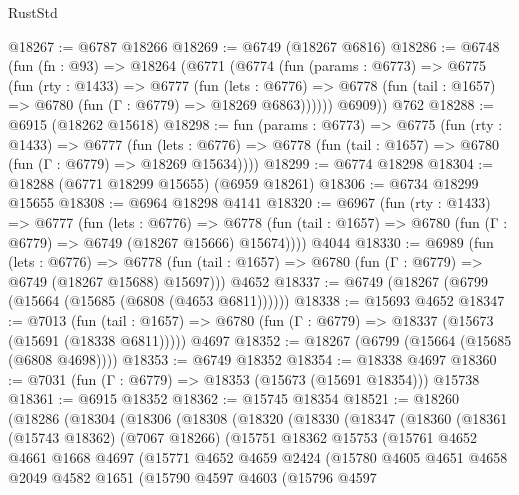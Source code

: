 \begin{lexlean}{RustStd}
\begin{coremodule}
@18267 := @6787 @18266
@18269 := @6749 (@18267 @6816)
@18286 := @6748
    (fun (fn : @93) =>
    @18264
      (@6771
        (@6774
          (fun (params : @6773) =>
          @6775
            (fun (rty : @1433) =>
            @6777
              (fun (lets : @6776) =>
              @6778 (fun (tail : @1657) => @6780 (fun (Γ : @6779) => @18269 @6863))))))
        @6909))
    @762
@18288 := @6915 (@18262 @15618)
@18298 := fun (params : @6773) =>
  @6775
    (fun (rty : @1433) =>
    @6777
      (fun (lets : @6776) =>
      @6778 (fun (tail : @1657) => @6780 (fun (Γ : @6779) => @18269 @15634))))
@18299 := @6774 @18298
@18304 := @18288 (@6771 @18299 @15655) (@6959 @18261)
@18306 := @6734 @18299 @15655
@18308 := @6964 @18298 @4141
@18320 := @6967
    (fun (rty : @1433) =>
    @6777
      (fun (lets : @6776) =>
      @6778 (fun (tail : @1657) => @6780 (fun (Γ : @6779) => @6749 (@18267 @15666) @15674))))
    @4044
@18330 := @6989
    (fun (lets : @6776) =>
    @6778 (fun (tail : @1657) => @6780 (fun (Γ : @6779) => @6749 (@18267 @15688) @15697)))
    @4652
@18337 := @6749 (@18267 (@6799 (@15664 (@15685 (@6808 (@4653 @6811))))))
@18338 := @15693 @4652
@18347 := @7013
    (fun (tail : @1657) => @6780 (fun (Γ : @6779) => @18337 (@15673 (@15691 (@18338 @6811)))))
    @4697
@18352 := @18267 (@6799 (@15664 (@15685 (@6808 @4698))))
@18353 := @6749 @18352
@18354 := @18338 @4697
@18360 := @7031 (fun (Γ : @6779) => @18353 (@15673 (@15691 @18354))) @15738
@18361 := @6915 @18352
@18362 := @15745 @18354
@18521 := @18260
    (@18286
      (@18304
        (@18306
          (@18308
            (@18320
              (@18330
                (@18347
                  (@18360
                    (@18361
                      (@15743 @18362)
                      (@7067 @18266)
                      (@15751
                        @18362
                        @15753
                        (@15761
                          @4652
                          @4661
                          @1668
                          @4697
                          (@15771
                            @4652
                            @4659
                            @2424
                            (@15780
                              @4605
                              @4651
                              @4658
                              @2049
                              @4582
                              @1651
                              (@15790
                                @4597
                                @4603
                                (@15796
                                  @4597

\end{coremodule}
\end{lexlean}
